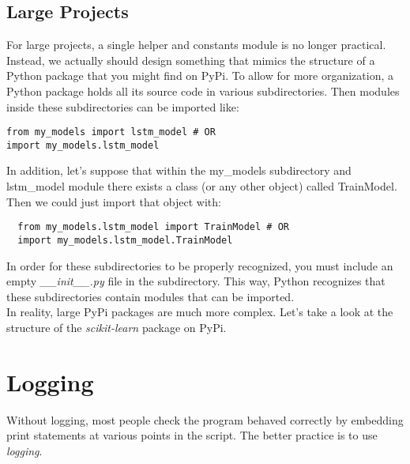 \documentclass{article}%
\begin{document}
\subsection{Large Projects}
For large projects, a single helper and constants module is no longer practical.
Instead, we actually should design something that mimics the structure of a Python package
that you might find on PyPi. To allow for more organization, a Python package holds
all its source code in various subdirectories. Then modules inside these subdirectories
can be imported like:

\begin{lstlisting}
from my_models import lstm_model # OR
import my_models.lstm_model
\end{lstlisting}

In addition, let's suppose that within the my\_models subdirectory and 
lstm\_model module there exists a class (or any other object) called 
TrainModel. Then we could just import that object with:

\begin{lstlisting}
  from my_models.lstm_model import TrainModel # OR
  import my_models.lstm_model.TrainModel
\end{lstlisting}

In order for these subdirectories to be properly recognized, you must include an empty 
\textit{\_\_init\_\_.py} file in the subdirectory. This way, Python recognizes that these
subdirectories contain modules that can be imported. \\ 

In reality, large PyPi packages are much more complex. Let's take a look at the structure
of the \textit{scikit-learn} package on PyPi.



\section{Logging}
Without logging, most people check the program behaved correctly by embedding print statements at various points in the script. The better practice is to use \textit{logging}. \\
\end{document}
